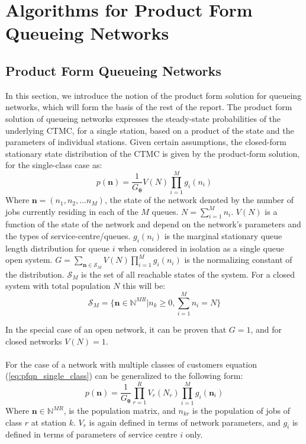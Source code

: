 \section{Algorithms for Product Form Queueing Networks}\label{sec:AlgorithmsPFQN}
\subsection{Product Form Queueing Networks}\label{sec:pfqn}
In this section, we introduce the notion of the product form solution for queueing networks, which will form the basis of the rest of the report. The product form solution of queueing networks expresses the steady-state probabilities of the underlying CTMC, for a single station, based on a product of the state and the parameters of individual stations. Given certain assumptions, the closed-form stationary state distribution of the CTMC is given by the product-form solution, for the single-class case as:
\begin{equation}\label{eq:pfqn_single_class}
    p(\mathbf{n}) = \frac{1}{G_{\mathbf{\theta}}} V(N) \prod_{i=1}^M g_i(n_i)
\end{equation}
Where \(\mathbf{n} = (n_1, n_2, ... n_M)\), the state of the network denoted by the number of jobs currently residing in each of the \(M\) queues. \(N = \sum_{i=1}^M n_i\). \(V(N)\) is a function of the state of the network and depend on the network's parameters and the types of service-centre/queues. \(g_i(n_i)\) is the marginal stationary queue length distribution for queue \(i\) when considered in isolation as a single queue open system. \(G = \sum_{\mathbf{n} \in \mathcal{S}_M} V(N) \prod_{i=1}^M g_i(n_i)\) is the normalizing constant of the distribution. \(\mathcal{S}_M\) is the set of all reachable states of the system. For a closed system with total population \(N\) this will be:
\[ \mathcal{S}_M = \{ \mathbf{n} \in \mathbb{N}^{MR} | n_k \geq 0, \sum_{i=1}^M n_i = N\}\]

In the special case of an open network, it can be proven that \(G=1\), and for closed networks \(V(N) = 1\). 
\\\\
For the case of a network with multiple classes of customers equation (\ref{eq:pfqn_single_class}) can be generalized to the following form:
\begin{equation}\label{eq:pfqn_multi_class}
    p(\mathbf{n}) = \frac{1}{G_{\mathbf{\theta}}} \prod_{r=1}^R V_r(N_r) \prod_{i=1}^M g_i(\mathbf{n}_i)
\end{equation}
Where \(\mathbf{n} \in \mathbb{N}^{MR}\), is the population matrix, and \(n_{kr}\) is the population of jobs of class \(r\) at station \(k\). \(V_r\) is again defined in terms of network parameters, and \(g_i\) is defined in terms of parameters of service centre \(i\) only. 

